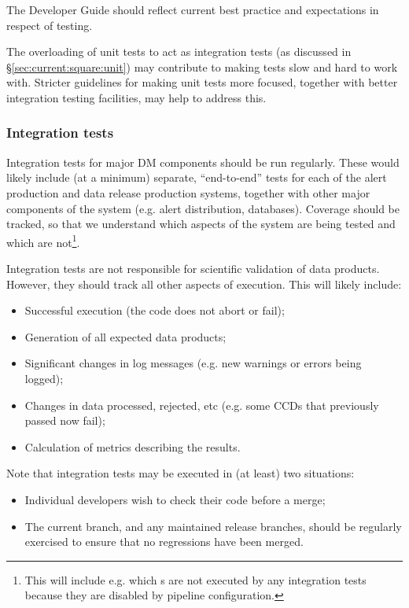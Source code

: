 \documentclass[DM,authoryear,toc,lsstdraft]{lsstdoc}
\begin{document}
The Developer Guide should reflect current best practice and expectations in
respect of testing.

The overloading of unit tests to act as integration tests (as discussed in
\S\ref{sec:current:square:unit}) may contribute to making tests slow and hard
to work with. Stricter guidelines for making unit tests more focused, together
with better integration testing facilities, may help to address this.

\subsubsection{Integration tests}

Integration tests for major DM components should be run regularly. These would
likely include (at a minimum) separate, ``end-to-end'' tests for each of the
alert production and data release production systems, together with other
major components of the system (e.g. alert distribution, databases). Coverage
should be tracked, so that we understand which aspects of the system are being
tested and which are not\footnote{This will include e.g. which s
are not executed by any integration tests because they are disabled by
pipeline configuration.}.

Integration tests are not responsible for scientific validation of data
products. However, they should track all other aspects of execution. This will
likely include:

\begin{itemize}

  \item{Successful execution (the code does not abort or fail);}
  \item{Generation of all expected data products;}
  \item{Significant changes in log messages (e.g. new warnings or errors being
  logged);}
  \item{Changes in data processed, rejected, etc (e.g. some CCDs that
  previously passed now fail);}
  \item{Calculation of \glspl{metric} describing the results.}

\end{itemize}

Note that integration tests may be executed in (at least) two situations:

\begin{itemize}

  \item{Individual developers wish to check their code before a merge;}
  \item{The current  branch, and any maintained release branches,
  should be regularly exercised to ensure that no regressions have been
  merged.}

\end{itemize}
\end{document}
